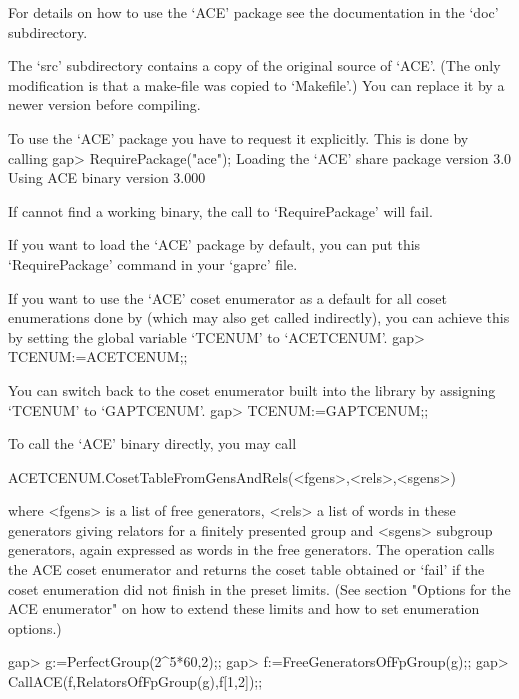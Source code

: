 For details on how to use the `ACE' package see the documentation in the
`doc' subdirectory.

The `src' subdirectory contains a copy of the original source of `ACE'. (The
only modification is that a make-file was copied to `Makefile'.) You can
replace it by a newer version before compiling.


To use the `ACE' package you have to request it explicitly. This is done by
calling 
\begintt
gap> RequirePackage("ace");
  Loading the `ACE' share package version 3.0
  Using ACE binary version 3.000
\endtt

If {\GAP} cannot find a working binary, the call to `RequirePackage' will
fail.

If you want to load the `ACE' package by default, you can put this
`RequirePackage' command in your `gaprc' file.

If you want to use the `ACE' coset enumerator as a default for all coset
enumerations done by {\GAP} (which may also get called indirectly), you can 
achieve this by setting the global variable `TCENUM' to `ACETCENUM'.
\begintt
gap> TCENUM:=ACETCENUM;;
\endtt

You
can switch back to the coset enumerator built into the {\GAP} library by
assigning `TCENUM' to `GAPTCENUM'.
\begintt
gap> TCENUM:=GAPTCENUM;;
\endtt



To call the `ACE' binary directly, you may call

\>ACETCENUM.CosetTableFromGensAndRels(<fgens>,<rels>,<sgens>)

where <fgens> is a list of free generators, <rels> a list of words in these
generators giving relators for a finitely presented group and <sgens>
subgroup generators, again expressed as words in the free generators. The
operation calls the ACE coset enumerator and returns the coset table
obtained or `fail' if the coset enumeration did not finish in the preset
limits. (See section "Options for the ACE enumerator" on how to extend these
limits and how to set enumeration options.)

\begintt
gap> g:=PerfectGroup(2^5*60,2);;
gap> f:=FreeGeneratorsOfFpGroup(g);;
gap> CallACE(f,RelatorsOfFpGroup(g),f{[1,2]});;
\endtt


